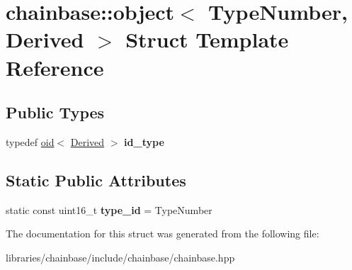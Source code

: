 \hypertarget{structchainbase_1_1object}{}\section{chainbase\+:\+:object$<$ Type\+Number, Derived $>$ Struct Template Reference}
\label{structchainbase_1_1object}
\subsection*{Public Types}
\begin{DoxyCompactItemize}
\item 
\mbox{\label{structchainbase_1_1object_a5d3d5fc451d8e453d3dbe8602a9a1423}} 
typedef \mbox{\hyperlink{classchainbase_1_1oid}{oid}}$<$ \mbox{\hyperlink{struct_derived}{Derived}} $>$ {\bfseries id\+\_\+type}
\end{DoxyCompactItemize}
\subsection*{Static Public Attributes}
\begin{DoxyCompactItemize}
\item 
\mbox{\label{structchainbase_1_1object_a30d3a5340e6fc59b4a2e044fcd42f0a2}} 
static const uint16\+\_\+t {\bfseries type\+\_\+id} = Type\+Number
\end{DoxyCompactItemize}


The documentation for this struct was generated from the following file\+:\begin{DoxyCompactItemize}
\item 
libraries/chainbase/include/chainbase/chainbase.\+hpp\end{DoxyCompactItemize}
